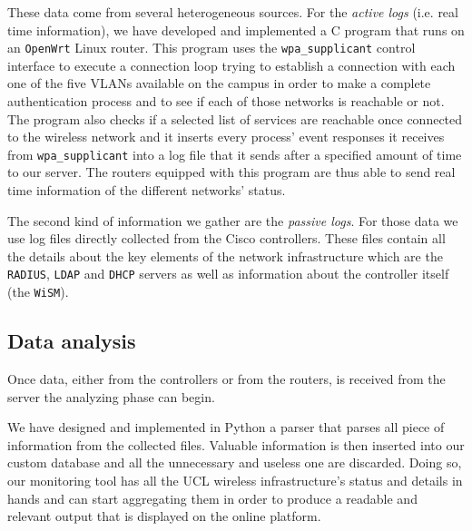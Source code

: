 These data come from several heterogeneous sources. For the \textit{active logs} (i.e. real time information), we have developed and implemented a C program that runs on an \texttt{OpenWrt} Linux router. This program uses the \texttt{wpa\_supplicant} control interface to execute a connection loop trying to establish a connection with each one of the five VLANs available on the campus in order to make a complete authentication process and to see if each of those networks is reachable or not. The program also checks if a selected list of services are reachable once connected to the wireless network and it inserts every process' event responses it receives from \texttt{wpa\_supplicant} into a log file that it sends after a specified amount of time to our server. The routers equipped with this program are thus able to send real time information of the different networks' status.

The second kind of information we gather are the \textit{passive logs}. For those data we use log files directly collected from the Cisco controllers. These files contain all the details about the key elements of the network infrastructure which are the \texttt{RADIUS}, \texttt{LDAP} and \texttt{DHCP} servers as well as information about the controller itself (the \texttt{WiSM}).


\subsection{Data analysis}
Once data, either from the controllers or from the routers, is received from the server the analyzing phase can begin.

We have designed and implemented in Python a parser that parses all piece of information from the collected files. Valuable information is then inserted into our custom database and all the unnecessary and useless one are discarded. Doing so, our monitoring tool has all the UCL wireless infrastructure's status and details in hands and can start aggregating them in order to produce a readable and relevant output that is displayed on the online platform.


